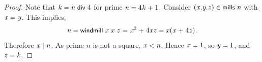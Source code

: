 \documentclass[sigplan,screen]{acmart}
\newcommand{\ee}{\ \HOLConst{=}\ } %
\renewcommand{\HOLinline}[1]{\ensuremath{#1}} %
\renewcommand{\HOLConst}[1]{{\fontsize{9pt}{1em}\selectfont\textsf{\upshape #1}}}
\renewcommand{\HOLNumLit}[1]{{\selectfont\textrm{\upshape #1}}} %
\renewcommand{\HOLSymConst}[1]{{\fontsize{9pt}{1em}\selectfont\textsf{\upshape #1}}}
\begin{document}
\begin{proof}
Note that \HOLinline{\HOLFreeVar{k}\;\HOLSymConst{=}\;\HOLFreeVar{n}\;\HOLConst{\HOLConst{div}}\;\HOLNumLit{4}} for prime \HOLinline{\HOLFreeVar{n}\;\HOLSymConst{=}\;\HOLNumLit{4}\HOLSymConst{\ensuremath{}}\HOLFreeVar{k}\;\HOLSymConst{\ensuremath{+}}\;\HOLNumLit{1}}.
Consider \HOLinline{(\HOLFreeVar{x}\HOLSymConst{,}\HOLFreeVar{y}\HOLSymConst{,}\HOLFreeVar{z})\;\HOLSymConst{\HOLTokenIn{}}\;\HOLConst{mills}\;\HOLFreeVar{n}} with \HOLinline{\HOLFreeVar{x}\;\HOLSymConst{=}\;\HOLFreeVar{y}}.
This implies,
\[
\HOLinline{\HOLFreeVar{n}\;\HOLSymConst{=}\;\HOLConst{windmill}\;\HOLFreeVar{x}\;\HOLFreeVar{x}\;\HOLFreeVar{z}} \ee \HOLinline{\HOLFreeVar{x}\HOLSymConst{\ensuremath{\sp{2}}}\;\HOLSymConst{\ensuremath{+}}\;\HOLNumLit{4}\HOLSymConst{\ensuremath{}}\HOLFreeVar{x}\HOLSymConst{\ensuremath{}}\HOLFreeVar{z}\;\HOLSymConst{=}\;\HOLFreeVar{x}\HOLSymConst{\ensuremath{}}(\HOLFreeVar{x}\;\HOLSymConst{\ensuremath{+}}\;\HOLNumLit{4}\HOLSymConst{\ensuremath{}}\HOLFreeVar{z})}.
\]
Therefore \HOLinline{\HOLFreeVar{x}\;\HOLConst{\ensuremath{\mid}}\;\HOLFreeVar{n}}.
As prime $n$ is not a square, \HOLinline{\HOLFreeVar{x}\;\HOLSymConst{\HOLTokenLt{}}\;\HOLFreeVar{n}}.
Hence \HOLinline{\HOLFreeVar{x}\;\HOLSymConst{=}\;\HOLNumLit{1}}, so \HOLinline{\HOLFreeVar{y}\;\HOLSymConst{=}\;\HOLNumLit{1}}, and \HOLinline{\HOLFreeVar{z}\;\HOLSymConst{=}\;\HOLFreeVar{k}}.  
\end{proof}
\end{document}
